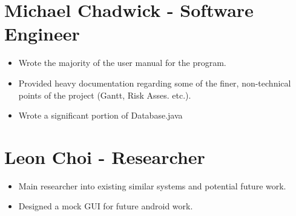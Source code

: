 \section{Michael Chadwick - Software Engineer}
\begin{itemize}
\item Wrote the majority of the user manual for the program.
\item Provided heavy documentation regarding some of the finer, non-technical
points of the project (Gantt, Risk Asses. etc.).
\item Wrote a significant portion of Database.java
\end{itemize}

\section{Leon Choi - Researcher}
\begin{itemize}
\item Main researcher into existing similar systems and potential future work.
\item Designed a mock GUI for future android work.
\end{itemize}
